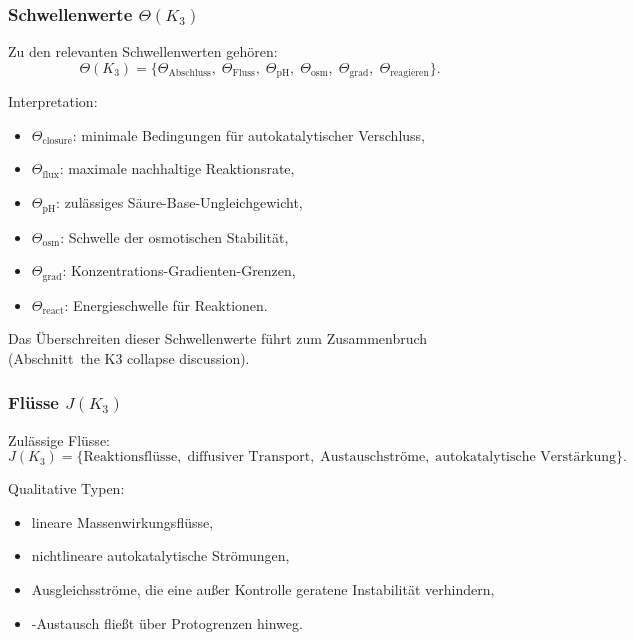 \subsubsection{Schwellenwerte \texorpdfstring{$\Theta(K_3)$}{\Theta(K_3)}}

Zu den relevanten Schwellenwerten gehören:
\[
\Theta(K_3) =
\{\Theta_{\mathrm{Abschluss}},\;
  \Theta_{\mathrm{Fluss}},\;
  \Theta_{\mathrm{pH}},\;
  \Theta_{\mathrm{osm}},\;
  \Theta_{\mathrm{grad}},\;
  \Theta_{\mathrm{reagieren}}\}.
\]

Interpretation:
\begin{itemize}
    \item $\Theta_{\mathrm{closure}}$: minimale Bedingungen für
          autokatalytischer Verschluss,
    \item $\Theta_{\mathrm{flux}}$: maximale nachhaltige Reaktionsrate,
    \item $\Theta_{\mathrm{pH}}$: zulässiges Säure-Base-Ungleichgewicht,
    \item $\Theta_{\mathrm{osm}}$: Schwelle der osmotischen Stabilität,
    \item $\Theta_{\mathrm{grad}}$: Konzentrations-Gradienten-Grenzen,
    \item $\Theta_{\mathrm{react}}$: Energieschwelle für Reaktionen.
\end{itemize}

Das Überschreiten dieser Schwellenwerte führt zum Zusammenbruch (Abschnitt~the K3 collapse discussion).

\subsubsection{Flüsse \texorpdfstring{$J(K_3)$}{J(K_3)}}

Zulässige Flüsse:
\[
J(K_3) = \{\text{Reaktionsflüsse},\; \text{diffusiver Transport},\;
         \text{Austauschströme},\; \text{autokatalytische Verstärkung}\}.
\]

Qualitative Typen:
\begin{itemize}
    \item lineare Massenwirkungsflüsse,
    \item nichtlineare autokatalytische Strömungen,
    \item Ausgleichsströme, die eine außer Kontrolle geratene Instabilität verhindern,
    \item-Austausch fließt über Protogrenzen hinweg.
\end{itemize}

